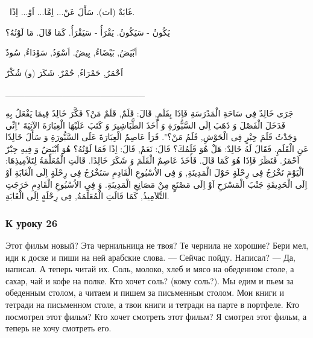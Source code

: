 \documentclass[a5paper]{article}
\begin{document}
\ غَابَةٌ (ات). سَأَلَ عَنْ... اِمَّا... اَوْ... اِذًا.

يَكُونُ - سَيَكُونُ. يَقْرَأُ - سَيَقْرَأُ. كَمَا قَالَ. مَا لَوْنُهُ؟ 

اَبْيَضُ, بَيْضَاءُ, بِيضٌ. اَسْوَدُ, سَوْدَاءُ, سُودٌ

اَحْمَرُ, حَمْرَاءُ, حُمْرٌ. شَكَرَ (و) شُكْرٌ

\_\_\_\_\_\_\_\_\_\_\_\_\_\_\_\_\_\_\_\_\_\_

جَرَى خَالِدٌ فِى سَاحَةِ الْمَدْرَسَةِ فَاِذَا بِقَلَمٍ, قَالَ: قَلَمٌ, قَلَمٌ مَنْ؟ فَكَّرَ خَالِدٌ فِيمَا يَفْعَلُ بِهِ فَدَخَلَ الْفَصْلَ وَ ذَهَبَ اِلَى السَّبُّورَةِ وَ أَخَذَ الطَّبَاشِيرَ وَ كَتَبَ عَلَيْهَا الْعِبَارَةَ الآتِيَةَ "اِنِّى وَجَدْتُ قَلَمَ حِبْرٍ فِى الْحَوْشِ, قَلَمُ مَنْ؟". قَرَاَ عَاصِمٌ الْعِبَارَةَ عَلَى السَّبُّورَةِ وَ سَأَلَ خَالِدًا عَنِ الْقَلَمِ. فَقَالَ لَهُ خَالِدٌ: هَلْ هُوَ قَلَمُكَ؟ قَالَ: نَعَمْ, قَالَ: اِذًا فَمَا لَوْنُهُ؟ هُوَ اَبْيَضُ وَ فِيهِ حِبْرٌ اَحْمَرُ. فَنَظَرَ فَاِذَا هُوَ كَمَا قَالَ. فَأَخَذَ عَاصِمٌ الْقَلَمَ وَ شَكَرَ خَالِدًا. قَالَتِ الْمُعَلِّمَةُ لِتَلاَمِيذِهَا: اَلْيَوْمَ نَخْرُجُ فِى رِحْلَةٍ حَوْلَ الْمَدِينَةِ, وَ فِى الاُسْبُوعِ الْقَادِمِ سَنَخْرُجُ فِى رِحْلَةٍ اِلَى الْغَابَةِ اَوْ اِلَى الْحَدِيقَةِ جَنْبَ الْمَسْرَحِ اَوْ اِلَى مَصْنَعٍ مِنْ مَصَانِعِ الْمَدِينَةِ. وَ فِى الاُسْبُوعِ الْقَادِمِ خَرَجَتِ التَّلاَمِيذُ, كَمَا قَالَتِ الْمُعَلِّمَةُ, فِى رِحْلَةٍ اِلَى الْغَابَةِ.

\subsubsection{К уроку 26}
Этот фильм новый? Эта чернильница не твоя? Те чернила не хорошие? Бери мел, иди к доске и пиши на ней арабские слова. — Сейчас пойду. Написал? — Да, написал. А теперь читай их. Соль, молоко, хлеб и мясо на обеденном столе, а сахар, чай и кофе на полке. Кто хочет соль? (кому соль?). Мы едим и пьем за обеденным столом, а читаем и пишем за письменным столом. Мои книги и тетради на письменном столе, а твои книги и тетради на парте в портфеле. Кто посмотрел этот фильм? Кто хочет смотреть этот фильм? Я смотрел этот фильм, а теперь не хочу смотреть его.
\end{document}
